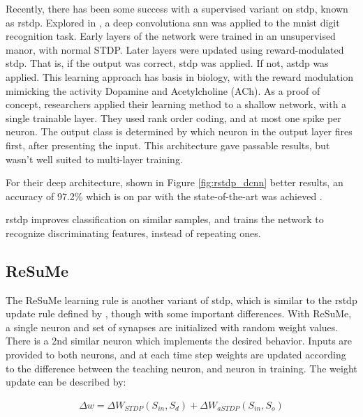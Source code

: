     Recently, there has been some success with a supervised variant on
    \gls{stdp}, known as \gls{rstdp}. Explored in \parencite{mozafari_2018}, a
    deep convolutiona \gls{snn} was applied to the \gls{mnist} digit recognition
    task. Early layers of the network were trained in an unsupervised manor,
    with normal STDP. Later layers were updated using reward-modulated
    \gls{stdp}. That is, if the output was correct, \gls{stdp} was applied. If
    not, \gls{astdp} was applied. This learning approach has basis in biology,
    with the reward modulation mimicking the activity Dopamine and Acetylcholine
    (ACh). As a proof of concept, researchers applied their learning method to a
    shallow network, with a single trainable layer. They used rank order coding,
    and at most one spike per neuron. The output class is determined by which
    neuron in the output layer fires first, after presenting the input. This
    architecture gave passable results, but wasn't well suited to multi-layer
    training.
    
    For their deep architecture, shown in Figure \ref{fig:rstdp_dcnn} better
    results, an accuracy of 97.2\% which is on par with the state-of-the-art was
    achieved \parencite{mozafari_2018}.
    

    \Gls{rstdp} improves classification on similar samples, and trains the network to
    recognize discriminating features, instead of repeating ones.

    \subsection{ReSuMe}
    The ReSuMe learning rule is another variant of \gls{stdp}, which is similar
    to the \gls{rstdp} update rule defined by \parencite{mozafari_2018}, though with some
    important differences. With ReSuMe, a single neuron and set of synapses are
    initialized with random weight values. There is a 2nd similar neuron
    which implements the desired behavior. Inputs are provided to both neurons,
    and at each time step weights are updated according to the difference
    between the teaching neuron, and neuron in training. The weight update can
    be described by:

    \begin{align}
      \Delta w = \Delta W_{STDP}(S_{in}, S_{d}) + \Delta W_{aSTDP}(S_{in}, S_{o}) \label{eq:resume_stdp}
    \end{align}

